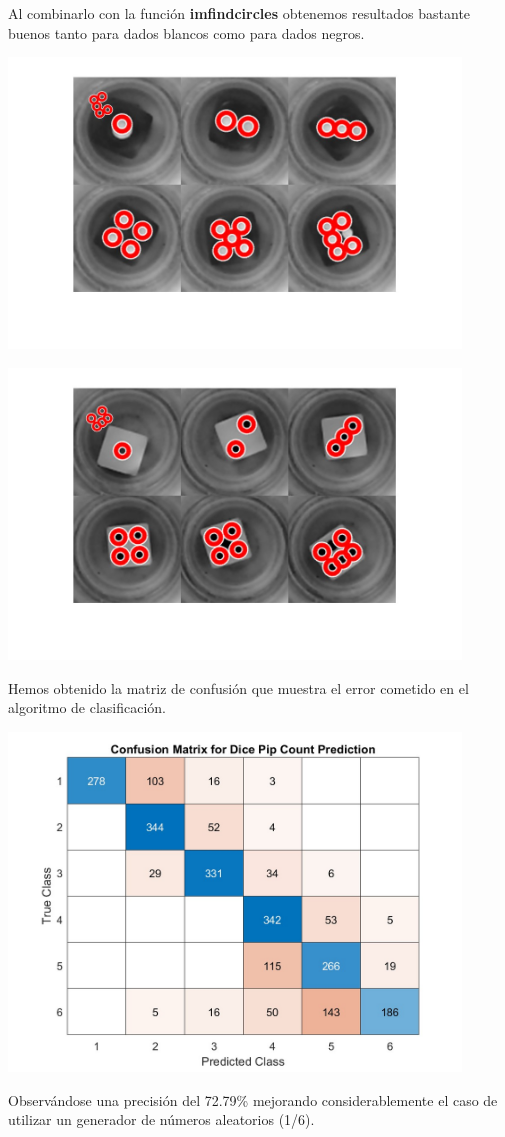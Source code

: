 Al combinarlo con la función \textbf{imfindcircles} obtenemos resultados bastante buenos tanto para dados blancos como para dados negros.

\begin{center}
    \includegraphics[width=0.9\textwidth]{ImagenesLatex/sobel_black.jpg}
\end{center}

\begin{center}
    \includegraphics[width=0.9\textwidth]{ImagenesLatex/sobel_white.jpg}
\end{center}

Hemos obtenido la matriz de confusión que muestra el error cometido en el algoritmo de clasificación.

\begin{center}
    \includegraphics[width=0.9\textwidth]{ImagenesLatex/confusion.jpg}
\end{center}

Observándose una precisión del 72.79\% mejorando considerablemente el caso de utilizar un generador de números aleatorios (1/6).
